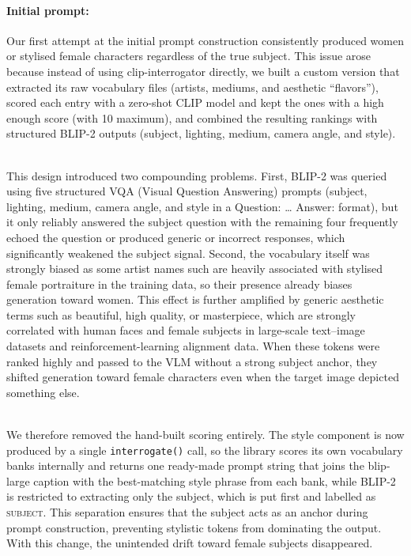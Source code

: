 \documentclass[runningheads]{llncs}
\begin{document}
\paragraph{\normalfont\textbf{Initial prompt:}}
\noindent
Our first attempt at the initial prompt construction consistently produced women or stylised female characters regardless of the true subject. This issue arose because instead of using clip-interrogator directly, we built a custom version that extracted its raw vocabulary files (artists, mediums, and aesthetic “flavors”), scored each entry with a zero-shot CLIP model and kept the ones with a high enough score (with 10 maximum), and combined the resulting rankings with structured BLIP-2 outputs (subject, lighting, medium, camera angle, and style).


\noindent
\\
This design introduced two compounding problems. First, BLIP-2 was queried using five structured VQA (Visual Question Answering) prompts (subject, lighting, medium, camera angle, and style in a Question: … Answer: format), but it only reliably answered the subject question with the remaining four frequently echoed the question or produced generic or incorrect responses, which significantly weakened the subject signal. Second, the vocabulary itself was strongly biased as some artist names such are heavily associated with stylised female portraiture in the training data, so their presence already biases generation toward women. This effect is further amplified by generic aesthetic terms such as beautiful, high quality, or masterpiece, which are strongly correlated with human faces and female subjects in large-scale text–image datasets and reinforcement-learning alignment data. When these tokens were ranked highly and passed to the VLM without a strong subject anchor, they shifted generation toward female characters even when the target image depicted something else.


\noindent
\\
We therefore removed the hand-built scoring entirely. The style component is now produced by a single \texttt{interrogate()} call, so the library scores its own vocabulary banks internally and returns one ready-made prompt string that joins the blip-large caption with the best-matching style phrase from each bank, while BLIP-2 is restricted to extracting only the subject, which is put first and labelled as \textsc{subject}. This separation ensures that the subject acts as an anchor during prompt construction, preventing stylistic tokens from dominating the output. With this change, the unintended drift toward female subjects disappeared.
\end{document}
